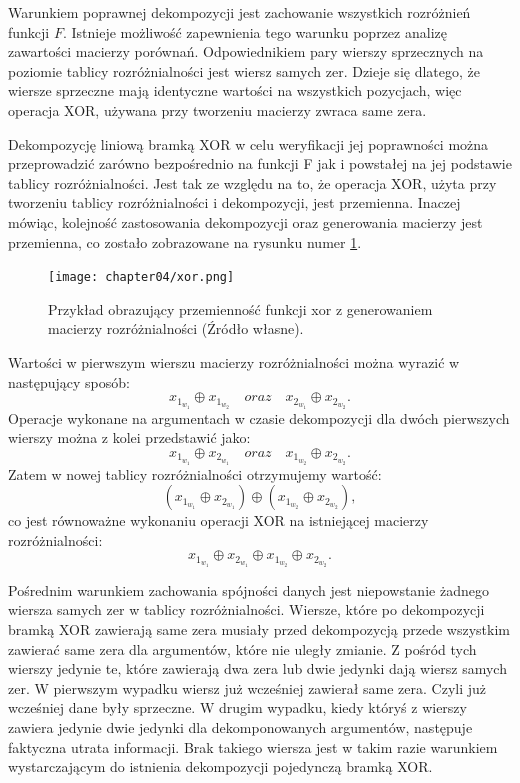 Warunkiem poprawnej dekompozycji jest zachowanie wszystkich rozróżnień funkcji $F$.
Istnieje możliwość zapewnienia tego warunku poprzez analizę zawartości macierzy porównań.
Odpowiednikiem pary wierszy sprzecznych na poziomie tablicy rozróżnialności jest wiersz samych zer.
Dzieje się dlatego,
że wiersze sprzeczne mają identyczne wartości na wszystkich pozycjach,
więc operacja XOR,
używana przy tworzeniu macierzy zwraca same zera.

Dekompozycję liniową bramką XOR w celu weryfikacji jej poprawności można przeprowadzić zarówno bezpośrednio na funkcji F jak i powstałej na jej podstawie tablicy rozróżnialności.
Jest tak ze względu na to,
że operacja XOR,
użyta przy tworzeniu tablicy rozróżnialności i dekompozycji,
jest przemienna.
Inaczej mówiąc,
kolejność zastosowania dekompozycji oraz generowania macierzy jest przemienna,
co zostało zobrazowane na rysunku numer \ref{fig:xor}.

\begin{figure}[H]
\centering
\texttt{[image: chapter04/xor.png]}
\caption{Przykład obrazujący przemienność funkcji xor z generowaniem macierzy rozróżnialności (Źródło własne).}
\label{fig:xor}
\end{figure}

Wartości w pierwszym wierszu macierzy rozróżnialności można wyrazić w następujący sposób:
\begin{equation}
x_{1_{w_1}} \oplus x_{1_{w_2}} \quad oraz \quad x_{2_{w_1}} \oplus x_{2_{w_2}}.
\end{equation}
Operacje wykonane na argumentach w czasie dekompozycji dla dwóch pierwszych wierszy można z kolei przedstawić jako:
\begin{equation}
x_{1_{w_1}} \oplus x_{2_{w_1}} \quad oraz \quad x_{1_{w_2}} \oplus x_{2_{w_2}}.
\end{equation}
Zatem w nowej tablicy rozróżnialności otrzymujemy wartość:
\begin{equation}
(x_{1_{w_1}} \oplus x_{2_{w_1}}) \oplus (x_{1_{w_2}} \oplus x_{2_{w_2}}),
\end{equation}
 co jest równoważne wykonaniu operacji XOR na istniejącej macierzy rozróżnialności:
\begin{equation}
x_{1_{w_1}} \oplus x_{2_{w_1}} \oplus x_{1_{w_2}} \oplus x_{2_{w_2}}.
\end{equation}

Pośrednim warunkiem zachowania spójności danych jest niepowstanie żadnego wiersza samych zer w tablicy rozróżnialności.
Wiersze,
które po dekompozycji bramką XOR zawierają same zera musiały przed dekompozycją przede wszystkim zawierać same zera dla argumentów,
które nie uległy zmianie.
Z pośród tych wierszy jedynie te,
które zawierają dwa zera lub dwie jedynki dają wiersz samych zer.
W pierwszym wypadku wiersz już wcześniej zawierał same zera.
Czyli już wcześniej dane były sprzeczne.
W drugim wypadku,
kiedy któryś z wierszy zawiera jedynie dwie jedynki dla dekomponowanych argumentów,
następuje faktyczna utrata informacji.
Brak takiego wiersza jest w takim razie warunkiem wystarczającym do istnienia dekompozycji pojedynczą bramką XOR.

